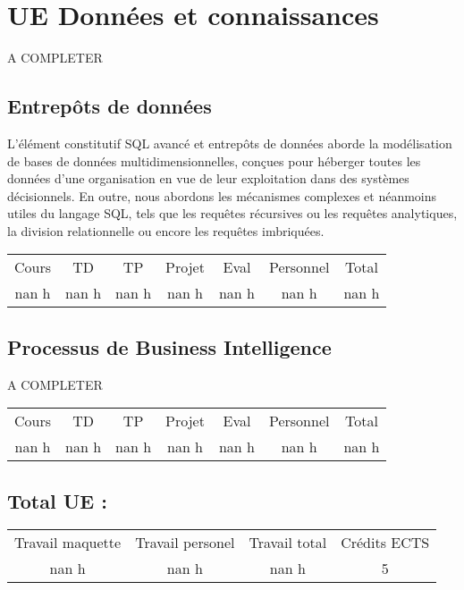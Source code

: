 \section{UE Données et connaissances}%
\label{sec:UEDonnesetconnaissances}%
A COMPLETER%
\subsection{Entrepôts de données}%
\label{subsec:Entreptsdedonnes}%

%
L'élément constitutif SQL avancé et entrepôts de données aborde la modélisation de bases de données multidimensionnelles, conçues pour héberger toutes les données d’une organisation en vue de leur exploitation dans des systèmes décisionnels. En outre, nous abordons les mécanismes complexes et néanmoins utiles du langage SQL, tels que les requêtes récursives ou les requêtes analytiques, la division relationnelle ou encore les requêtes imbriquées.%
\begin{longtable}{c c c c c c c}%
\hline%
Cours&TD&TP&Projet&Eval&Personnel&Total\\%
nan h&nan h&nan h&nan h&nan h&nan h&nan h\\%
\hline%
\end{longtable}%
\subsection{Processus de Business Intelligence}%
\label{subsec:ProcessusdeBusinessIntelligence}%

%
A COMPLETER%
\begin{longtable}{c c c c c c c}%
\hline%
Cours&TD&TP&Projet&Eval&Personnel&Total\\%
nan h&nan h&nan h&nan h&nan h&nan h&nan h\\%
\hline%
\end{longtable}%
\subsection{Total UE :}%
\label{subsec:TotalUE}%

%
\begin{longtable}{c c c c}%
\hline%
Travail maquette&Travail personel&Travail total&Crédits ECTS\\%
nan h&nan h&nan h&5\\%
\hline%
\end{longtable}